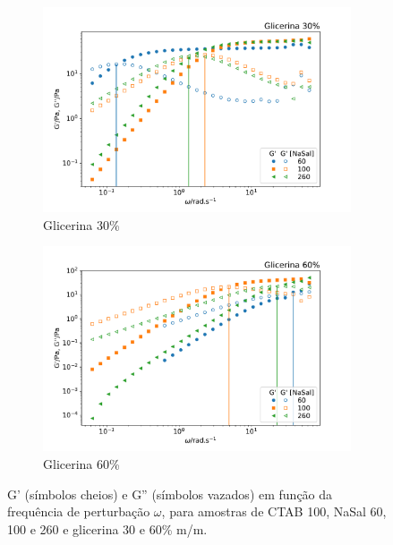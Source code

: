 	\begin{figure}[h]
		\begin{subfigure}[t]{0.5\textwidth}
			\centering
			\includegraphics[width=\textwidth]{imagens/reologia/oscilatorio_glic30p}
			\caption{Glicerina 30\%}
			\label{fig:oscilatorio_glic_30p}
		\end{subfigure} %
		\begin{subfigure}[t]{0.5\textwidth}
			\centering
			\includegraphics[width=\textwidth]{imagens/reologia/oscilatorio_glic60p}
			\caption{Glicerina 60\%}
			\label{fig:oscilatorio_glic_60p}
		\end{subfigure} %
	\caption{G' (símbolos cheios) e G'' (símbolos vazados) em função da frequência de perturbação \(\omega\), para amostras de CTAB 100\mM{}, NaSal 60, 100 e 260\mM{} e glicerina 30 e 60\% m/m.}
	\label{fig:oscilatorio_glicerina}
	\end{figure}

